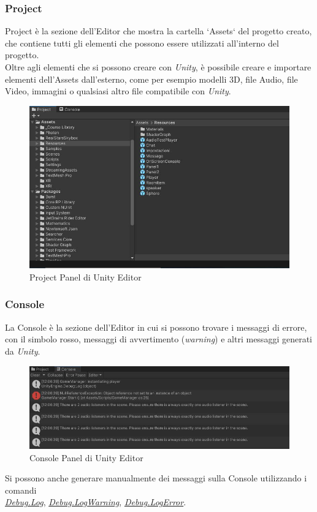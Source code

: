 \subsubsection{Project}
Project\cite{unityProject} è la sezione dell'Editor che mostra la cartella `Assets` del progetto creato, che contiene tutti gli elementi che possono essere utilizzati all'interno del progetto.
\\Oltre agli elementi che si possono creare con \textit{Unity}, è possibile creare e importare elementi dell'Assets dall'esterno, come per esempio modelli 3D, file Audio, file Video, immagini o qualsiasi altro file compatibile con \textit{Unity}.
\vspace{1cm}
\begin{figure}[H]
    \centering
    \includegraphics[scale = 0.7]{Immagini/Project.jpg}
    \caption{Project Panel di Unity Editor}
    \label{fig:my_label}
\end{figure}
\subsubsection{Console}
La Console\cite{unityconsole} è la sezione dell'Editor in cui si possono trovare i messaggi di errore, con il simbolo rosso, messaggi di avvertimento (\textit{warning}) e altri messaggi generati da \textit{Unity}.
\begin{figure}[H]
    \centering
    \includegraphics[scale = 0.75]{Immagini/Console.jpg}
    \caption{Console Panel di Unity Editor}
    \label{fig:my_label}
\end{figure}
\hspace{-0.6cm}Si possono anche generare manualmente dei messaggi sulla Console utilizzando i comandi \\\textit{\underline{Debug.Log}}, \textit{\underline{Debug.LogWarning}}, \textit{\underline{Debug.LogError}}.
